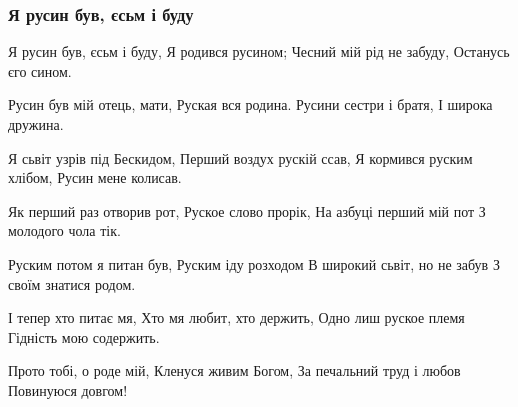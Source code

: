  
 
 

\subsubsection{Я русин був, єсьм і буду}

Я русин був, єсьм і буду,
Я родився русином;
Чесний мій рід не забуду,
Останусь єго сином.

Русин був мій отець, мати,
Руская вся родина.
Русини сестри і братя,
І широка дружина.

Я сьвіт узрів під Бескидом,
Перший воздух рускій ссав,
Я кормився руским хлібом,
Русин мене колисав.

Як перший раз отворив рот,
Руское слово прорік,
На азбуці перший мій пот
З молодого чола тік.

Руским потом я питан був,
Руским іду розходом
В широкий сьвіт, но не забув
З своїм знатися родом.

І тепер хто питає мя,
Хто мя любит, хто держить,
Одно лиш руское племя
Гідність мою содержить.

Прото тобі, о роде мій,
Кленуся живим Богом,
За печальний труд і любов
Повинуюся довгом!
